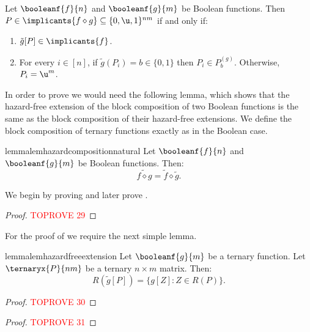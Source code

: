 \documentclass[acmsmall, nonacm, authorversion]{acmart}
\begin{document}
\begin{proposition}\label{prop:prime-implicants-composition}
Let $\booleanf{f}{n}$ and $\booleanf{g}{m}$ be Boolean functions. Then $P\in \implicants{f\diamond g} \subseteq \{0,\u,1\}^{nm}$ if and only if:
\begin{enumerate}
    \item $\tilde{g}[P] \in \implicants{f}$. \label{item:prime-implicants-composition-1}
    \item For every $i\in[n]$, if $\tilde{g}(P_i)=b\in\{0,1\}$ then $P_i\in P_{b}^{(g)}$. Otherwise, $P_i=\u^m$. \label{item:prime-implicants-composition-2}
\end{enumerate}
\end{proposition}
In order to prove  we would need the following lemma, which shows that the hazard-free extension of the block composition of two Boolean functions is the same as the block composition of their hazard-free extensions. We define the block composition of ternary functions exactly as in the Boolean case.
\begin{restatable}{lemma}{lemhazardcompositionnatural}\label{lem:hazard-free-extension-composition}
Let $\booleanf{f}{n}$ and $\booleanf{g}{m}$ be Boolean functions. Then:
\[
\widetilde{f\diamond g} = \tilde{f} \diamond \tilde{g}.
\]
\end{restatable}
We begin by proving  and later prove .
\begin{proof}\textcolor{red}{TOPROVE 29}\end{proof}

For the proof of  we require the next simple lemma.

\begin{restatable}{lemma}{lemhazardfreeextension}\label{lem:hazard-free-extension-composition-aux}
Let $\booleanf{g}{m}$ be a ternary function. Let $\ternaryx{P}{nm}$ be a ternary $n\times m$ matrix. Then:
\[
R(\tilde{g}[P])=\{g[Z]: Z\in R(P)\}.
\]    
\end{restatable}
\begin{proof}\textcolor{red}{TOPROVE 30}\end{proof}

\begin{proof}\textcolor{red}{TOPROVE 31}\end{proof}
\end{document}
